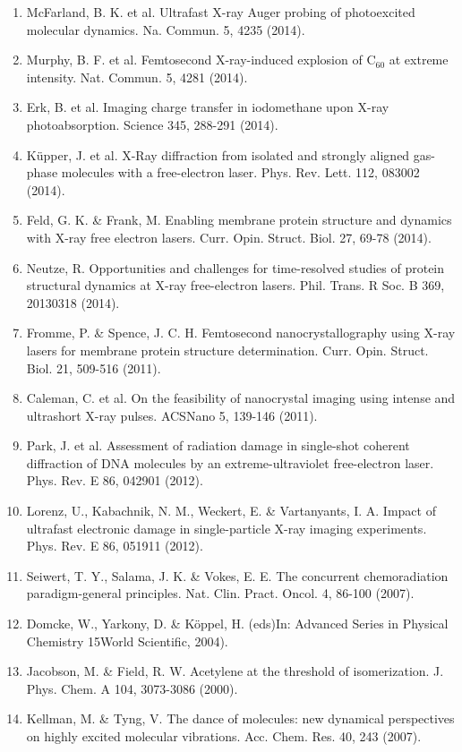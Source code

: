 \documentclass[10pt]{article}
\begin{document}
\begin{enumerate}
  \item McFarland, B. K. et al. Ultrafast X-ray Auger probing of photoexcited molecular dynamics. Na. Commun. 5, 4235 (2014).
  \item Murphy, B. F. et al. Femtosecond X-ray-induced explosion of $\mathrm{C}_{60}$ at extreme intensity. Nat. Commun. 5, 4281 (2014).
  \item Erk, B. et al. Imaging charge transfer in iodomethane upon X-ray photoabsorption. Science 345, 288-291 (2014).
  \item Küpper, J. et al. X-Ray diffraction from isolated and strongly aligned gas-phase molecules with a free-electron laser. Phys. Rev. Lett. 112, 083002 (2014).
  \item Feld, G. K. \& Frank, M. Enabling membrane protein structure and dynamics with X-ray free electron lasers. Curr. Opin. Struct. Biol. 27, 69-78 (2014).
  \item Neutze, R. Opportunities and challenges for time-resolved studies of protein structural dynamics at X-ray free-electron lasers. Phil. Trans. R Soc. B 369, 20130318 (2014).
  \item Fromme, P. \& Spence, J. C. H. Femtosecond nanocrystallography using X-ray lasers for membrane protein structure determination. Curr. Opin. Struct. Biol. 21, 509-516 (2011).
  \item Caleman, C. et al. On the feasibility of nanocrystal imaging using intense and ultrashort X-ray pulses. ACSNano 5, 139-146 (2011).
  \item Park, J. et al. Assessment of radiation damage in single-shot coherent diffraction of DNA molecules by an extreme-ultraviolet free-electron laser. Phys. Rev. E 86, 042901 (2012).
  \item Lorenz, U., Kabachnik, N. M., Weckert, E. \& Vartanyants, I. A. Impact of ultrafast electronic damage in single-particle X-ray imaging experiments. Phys. Rev. E 86, 051911 (2012).
  \item Seiwert, T. Y., Salama, J. K. \& Vokes, E. E. The concurrent chemoradiation paradigm-general principles. Nat. Clin. Pract. Oncol. 4, 86-100 (2007).
  \item Domcke, W., Yarkony, D. \& Köppel, H. (eds)In: Advanced Series in Physical Chemistry 15World Scientific, 2004).
  \item Jacobson, M. \& Field, R. W. Acetylene at the threshold of isomerization. J. Phys. Chem. A 104, 3073-3086 (2000).
  \item Kellman, M. \& Tyng, V. The dance of molecules: new dynamical perspectives on highly excited molecular vibrations. Acc. Chem. Res. 40, 243 (2007).

\end{enumerate}
\end{document}
